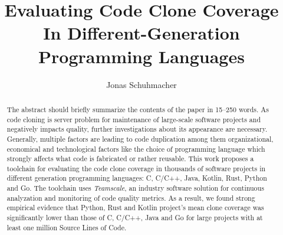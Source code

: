 \documentclass[runningheads]{llncs}
\def\teamscale{\textit{Teamscale}}
\begin{document}
%
\title{Evaluating Code Clone Coverage In Different-Generation Programming Languages}
%
%
%
\author{Jonas Schuhmacher}
%
\maketitle %
%
%
\begin{abstract}
The abstract should briefly summarize the contents of the paper in
15--250 words.
As code cloning is server problem for maintenance of large-scale software projects and negatively impacts quality, further investigations about its appearance are necessary. Generally, multiple factors are leading to code duplication among them organizational, economical and technological factors like the choice of programming language which strongly affects what code is fabricated or rather reusable.
This work proposes a toolchain for evaluating the code clone coverage in thousands of software projects in different generation programming languages: C, C/C++, Java, Kotlin, Rust, Python and Go. The toolchain uses \teamscale{}, an industry software solution for continuous analyzation and monitoring of code quality metrics.
As a result, we found strong empirical evidence that Python, Rust and Kotlin project’s mean clone coverage was significantly lower than those of C, C/C++, Java and Go for large projects with at least one million Source Lines of Code.

\end{abstract}
%
%







%
%
\appendix

%
%


%
\end{document}
